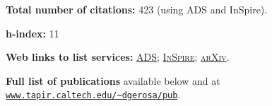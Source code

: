 \documentclass[11pt,letterpaper,sans]{moderncv}
\begin{document}
\textbf{Total number of citations:} 423 (using ADS and InSpire).

\textbf{h-index:} 11


\textbf{Web links to list services:}
\href{http://labs.adsabs.harvard.edu/adsabs/search/?q=author%3A%22Gerosa%2C+Davide%22&month_from=&year_from=&month_to=&year_to=&db_f=&nr=&article=1&bigquery=&re_sort_type=CITED&re_sort_dir=desc}{\textsc{ADS}}; 
\href{http://inspirehep.net/search?ln=en&ln=en&p=exactauthor%3AD.Gerosa.1&of=hb&action_search=Search&sf=&so=d&rm=citation&rg=25&sc=0}{\textsc{InSpire}}; 
\href{http://arxiv.org/a/gerosa_d_1.html}{\textsc{arXiv}}.

\textbf{Full list of publications} available below and  at \href{http://www.tapir.caltech.edu/~dgerosa/pub}{\texttt{www.tapir.caltech.edu/\textasciitilde dgerosa/pub}}.






\vspace{+0.2cm}
\cvitem{\textcolor{color1}{Selected publications}}{}
\vspace{-0.7cm}
\end{document}
